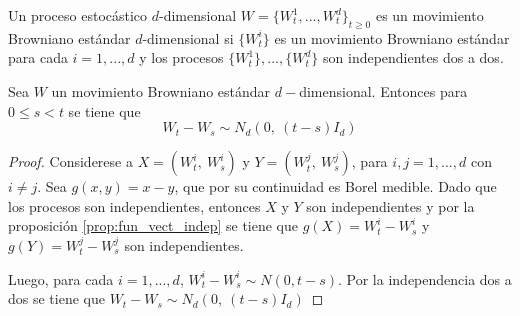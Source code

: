 \begin{definition}
    Un proceso estocástico $d$-dimensional $W = \{W_t^1,...,
    W_t^d\}_{t\geq 0}$ es un movimiento Browniano estándar
    $d$-dimensional si $\{W_t^i\}$ es un movimiento Browniano 
    estándar para cada $i=1,...,d$ y los procesos $\{W_t^1\},...,\{W_t^d\}$ 
    son independientes dos a dos.
\end{definition}

\begin{proposition}\label{prop:dist_saltos_MB}
    Sea $W$ un movimiento Browniano estándar $d-$dimensional. Entonces 
    para $0\leq s < t$ se tiene que 
    $$W_t-W_s \sim N_d(0,\ (t-s)I_d)$$
\end{proposition}

\begin{proof}
Considerese a $X=(W_t^i,\ W_s^i)$ y $Y=(W_t^j,\ W_s^j)$, para
$i,j=1,...,d$ con $i\not = j$. Sea $g(x,y)=x-y$, que por su 
continuidad es Borel medible. Dado que los procesos son independientes, 
entonces $X$ y $Y$ son independientes y por la proposición \ref{prop:fun_vect_indep}
se tiene que $g(X)=W_t^i-W_s^i$ y $g(Y)=W_t^j-W_s^j$ son independientes.

Luego, para cada $i=1,...,d$, $W_t^i-W_s^i\sim N(0, t-s)$. Por la 
independencia dos a dos se tiene que $W_t-W_s \sim N_d(0,\ (t-s)I_d)$
\end{proof}

